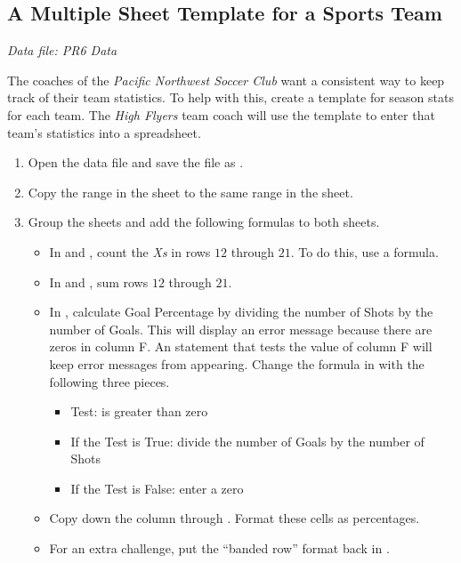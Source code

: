 \subsection{A Multiple Sheet Template for a Sports Team}

\textit{Data file: PR6 Data}

The coaches of the \textit{Pacific Northwest Soccer Club} want a consistent way to keep track of their team statistics. To help with this, create a template for season stats for each team. The \textit{High Flyers} team coach will use the template to enter that team's statistics into a spreadsheet.

\begin{enumerate}
	\item Open the data file  and save the file as .
	\item Copy the range  in the  sheet to the same range in the  sheet.
	\item Group the sheets and add the following formulas to both sheets.

	\begin{itemize}
		\item In  and , count the \textit{Xs} in rows $ 12 $ through $ 21 $. To do this, use a  formula.
		\item In  and , sum rows $ 12 $ through $ 21 $.
		\item In , calculate Goal Percentage by dividing the number of Shots by the number of Goals. This will display an error message because there are zeros in column F. An  statement that tests the value of column F will keep error messages from appearing. Change the formula in  with the following three pieces.
		\begin{itemize}
			\item Test: is  greater than zero
			\item If the Test is True: divide the number of Goals by the number of Shots
			\item If the Test is False: enter a zero
		\end{itemize}
		\item Copy  down the column through . Format these cells as percentages.
		\item For an extra challenge, put the ``banded row'' format back in .
		\end{itemize}	
	

\end{enumerate}

